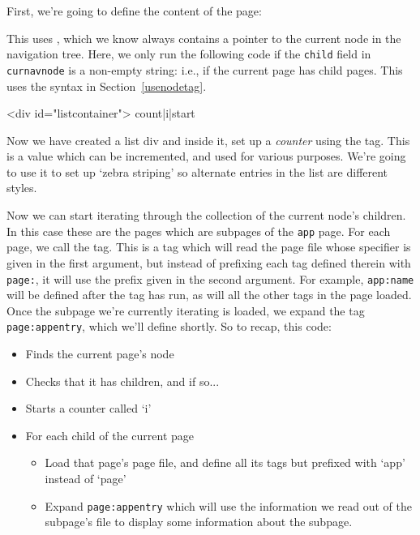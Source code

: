 First, we're going to define the content of the page:
\begin{MyVerbatim}
content=[[
{{ifnotempty|{{curnavnode|child}}|
\end{MyVerbatim}
This uses , which we know always contains a pointer to the current node in the navigation tree.
Here, we only run the following code if the \texttt{child} field in \texttt{curnavnode} is
a non-empty string: i.e., if the current page has child pages. This uses
the syntax in Section~\ref{usenodetag}.
\begin{MyVerbatim}
    <div id="listcontainer">
        {{count|i|start}}
\end{MyVerbatim}
Now we have created a list div and inside it, set up a \emph{counter} using
the  tag. This is a value which
can be incremented, and used for various purposes. We're going to use it to set up `zebra
striping' so alternate entries in the list are different styles.
\begin{MyVerbatim}
        {{foreach|{{curnavnode|child}}|a|
            {{loadpage|{{a:spec}}|app}}
            {{page:appentry}}
        }}
    </div>
|}}        
]]
\end{MyVerbatim}
Now we can start iterating through the collection of the current node's children. In this case
these are the pages which are subpages of the \texttt{app} page. For each page, we call the
 tag. This is a tag which will read the page file whose specifier is given
in the first argument, but instead of prefixing each tag defined therein with \texttt{page:}, it
will use the prefix given in the second argument. For example, \texttt{app:name} will be defined
after the tag has run, as will all the other tags in the page loaded. Once the subpage we're currently
iterating is loaded, we expand the tag \texttt{page:appentry}, which we'll define shortly.
\clearpage
So to recap, this code:
\begin{itemize}
\item Finds the current page's node
\item Checks that it has children, and if so...
\item Starts a counter called `i'
\item For each child of the current page
\begin{itemize}
\item Load that page's page file, and define all its tags but prefixed with `app' instead of `page'
\item Expand \texttt{page:appentry} which will use the information we read out of the subpage's file
to display some information about the subpage.
\end{itemize}
\end{itemize}
